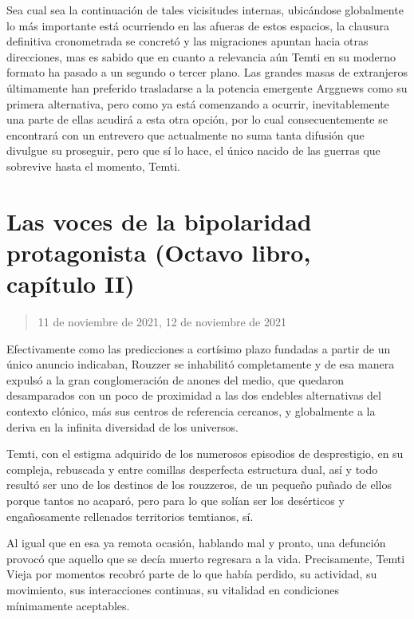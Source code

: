 \documentclass[
]{book}
\begin{document}
Sea cual sea la continuación de tales vicisitudes internas, ubicándose globalmente lo más importante está ocurriendo en las afueras de estos espacios, la clausura definitiva cronometrada se concretó y las migraciones apuntan hacia otras direcciones, mas es sabido que en cuanto a relevancia aún Temti en su moderno formato ha pasado a un segundo o tercer plano. Las grandes masas de extranjeros últimamente han preferido trasladarse a la potencia emergente Arggnews como su primera alternativa, pero como ya está comenzando a ocurrir, inevitablemente una parte de ellas acudirá a esta otra opción, por lo cual consecuentemente se encontrará con un entrevero que actualmente no suma tanta difusión que divulgue su proseguir, pero que sí lo hace, el único nacido de las guerras que sobrevive hasta el momento, Temti.

\hypertarget{las-voces-de-la-bipolaridad-protagonista-octavo-libro-capuxedtulo-ii}{%
\section{Las voces de la bipolaridad protagonista (Octavo libro, capítulo II)}\label{las-voces-de-la-bipolaridad-protagonista-octavo-libro-capuxedtulo-ii}}

\begin{quote}
11 de noviembre de 2021, 12 de noviembre de 2021
\end{quote}

Efectivamente como las predicciones a cortísimo plazo fundadas a partir de un único anuncio indicaban, Rouzzer se inhabilitó completamente y de esa manera expulsó a la gran conglomeración de anones del medio, que quedaron desamparados con un poco de proximidad a las dos endebles alternativas del contexto clónico, más sus centros de referencia cercanos, y globalmente a la deriva en la infinita diversidad de los universos.

Temti, con el estigma adquirido de los numerosos episodios de desprestigio, en su compleja, rebuscada y entre comillas desperfecta estructura dual, así y todo resultó ser uno de los destinos de los rouzzeros, de un pequeño puñado de ellos porque tantos no acaparó, pero para lo que solían ser los desérticos y engañosamente rellenados territorios temtianos, sí.

Al igual que en esa ya remota ocasión, hablando mal y pronto, una defunción provocó que aquello que se decía muerto regresara a la vida. Precisamente, Temti Vieja por momentos recobró parte de lo que había perdido, su actividad, su movimiento, sus interacciones continuas, su vitalidad en condiciones mínimamente aceptables.
\end{document}
